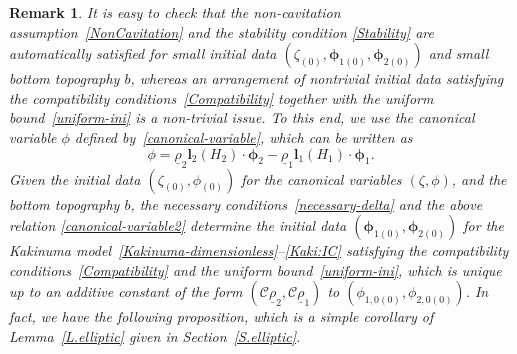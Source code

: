 \documentclass[11pt,leqno]{article}
\newtheorem{remark}[theorem]{\bf Remark}
\numberwithin{equation}{section}
\numberwithin{figure}{section}
\begin{document}
%
\begin{remark}\label{remark-ini}
{\rm 
It is easy to check that the non-cavitation assumption~\eqref{NonCavitation} and the stability condition 
\eqref{Stability} are automatically satisfied for small initial data $(\zeta_{(0)},\bm{\phi}_{1(0)},\bm{\phi}_{2(0)})$ 
and small bottom topography $b$, whereas an arrangement of nontrivial initial data satisfying the compatibility 
conditions~\eqref{Compatibility} together with the uniform bound~\eqref{uniform-ini} is a non-trivial issue. 
To this end, we use the canonical variable $\phi$ defined by~\eqref{canonical-variable}, 
which can be written as 
%
\begin{equation}\label{canonical-variable2}
\phi = \underline{\rho}_2\bm{l}_2(H_2)\cdot\bm{\phi}_2 - \underline{\rho}_1\bm{l}_1(H_1)\cdot\bm{\phi}_1. 
\end{equation}
%
Given the initial data $(\zeta_{(0)},\phi_{(0)})$ for the canonical variables $(\zeta,\phi)$, %
and the bottom topography $b$, the necessary conditions~\eqref{necessary-delta} and the above relation 
\eqref{canonical-variable2} determine the initial data $(\bm{\phi}_{1(0)},\bm{\phi}_{2(0)})$ for the Kakinuma model~\eqref{Kakinuma-dimensionless}--\eqref{Kaki:IC}
satisfying the compatibility conditions~\eqref{Compatibility} and the uniform bound~\eqref{uniform-ini}, 
which is unique up to an additive constant of the form $(\mathcal{C}\underline{\rho}_2,\mathcal{C}\underline{\rho}_1)$ 
to $(\phi_{1,0(0)},\phi_{2,0(0)})$. 
In fact, we have the following proposition, which is a simple corollary of Lemma~\ref{L.elliptic} given in 
Section~\ref{S.elliptic}. 
}
\end{remark}
\end{document}
